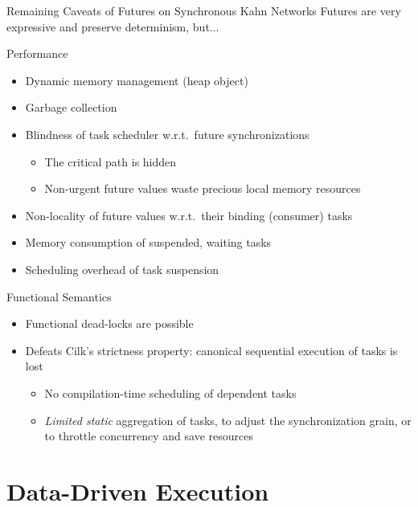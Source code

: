 \documentclass[xcolor=dvipsnames,9pt,mathserif]{beamer}
\begin{document}
\begin{frame}{Remaining Caveats of Futures on Synchronous Kahn Networks}
  Futures are very expressive and preserve determinism, but...
  
  \begin{block}{Performance}
    \begin{itemize}
    \item \color{gray}Dynamic memory management (heap object)
    \item \color{gray}Garbage collection
    \item Blindness of task scheduler w.r.t.\ future synchronizations
      \begin{itemize}
      \item The critical path is hidden
      \item Non-urgent future values waste precious local memory resources 
      \end{itemize}
    \item Non-locality of future values w.r.t.\ their binding (consumer) tasks
    \item Memory consumption of suspended, waiting tasks
    \item Scheduling overhead of task suspension
    \end{itemize}
  \end{block}
  
  \begin{block}{Functional Semantics}
    \begin{itemize}
    \item \color{gray}Functional dead-locks are possible
    \item \color{gray}Defeats Cilk's strictness property: canonical sequential
      execution of tasks is lost
      \begin{itemize}
      \item \color{gray}No compilation-time scheduling of dependent tasks
      \item \textit{Limited static} aggregation of tasks, to adjust the
        synchronization grain, or to throttle concurrency and save resources
      \end{itemize}
    \end{itemize}
  \end{block}
\end{frame}

\section{Data-Driven Execution}
\end{document}
